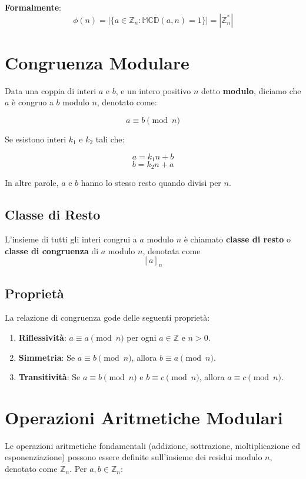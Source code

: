 \documentclass[a4paper,12pt]{report}
\begin{document}
\textbf{Formalmente}:\[\phi(n) = |\{a \in \mathbb{Z}_n : \mathbb{MCD}(a, n) = 1\}| = |\mathbb{Z}_n^*|\]
\section{Congruenza Modulare}

Data una coppia di interi $a$ e $b$, e un intero positivo $n$ detto \textbf{modulo}, diciamo che $a$ è congruo a $b$ modulo $n$, denotato come:

$$a \equiv b \pmod{n}$$

Se esistono interi $k_1$ e $k_2$ tali che:

$$a = k_1n + b$$
$$b = k_2n + a$$

In altre parole, $a$ e $b$ hanno lo stesso resto quando divisi per $n$. 

\subsection*{Classe di Resto}
L'insieme di tutti gli interi congrui a $a$ modulo $n$ è chiamato \textbf{classe di resto} o \textbf{classe di congruenza} di $a$ modulo $n$, denotata come \[[a]_n\]

\subsection*{Proprietà}
La relazione di congruenza gode delle seguenti proprietà:

\begin{enumerate}
    \item \textbf{Riflessività}: $a \equiv a \pmod{n}$ per ogni $a \in \mathbb{Z}$ e $n > 0$.
    \item \textbf{Simmetria}: Se $a \equiv b \pmod{n}$, allora $b \equiv a \pmod{n}$.
    \item \textbf{Transitività}: Se $a \equiv b \pmod{n}$ e $b \equiv c \pmod{n}$, allora $a \equiv c \pmod{n}$.
\end{enumerate}

\section{Operazioni Aritmetiche Modulari}
Le operazioni aritmetiche fondamentali (addizione, sottrazione, moltiplicazione ed esponenziazione) possono essere definite sull'insieme dei residui modulo $n$, denotato come $\mathbb{Z}_n$. Per $a, b \in \mathbb{Z}_n$:
\end{document}
